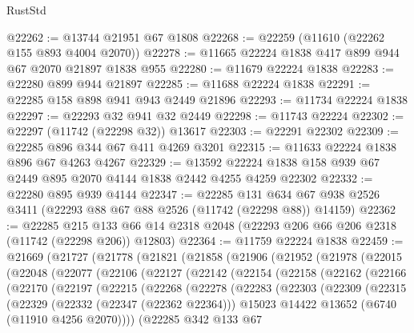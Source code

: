 \begin{lexlean}{RustStd}
\begin{coremodule}
@22262 := @13744 @21951 @67 @1808
@22268 := @22259 (@11610 (@22262 @155 @893 @4004 @2070))
@22278 := @11665 @22224 @1838 @417 @899 @944 @67 @2070 @21897 @1838 @955
@22280 := @11679 @22224 @1838
@22283 := @22280 @899 @944 @21897
@22285 := @11688 @22224 @1838
@22291 := @22285 @158 @898 @941 @943 @2449 @21896
@22293 := @11734 @22224 @1838
@22297 := @22293 @32 @941 @32 @2449
@22298 := @11743 @22224
@22302 := @22297 (@11742 (@22298 @32)) @13617
@22303 := @22291 @22302
@22309 := @22285 @896 @344 @67 @411 @4269 @3201
@22315 := @11633 @22224 @1838 @896 @67 @4263 @4267
@22329 := @13592 @22224 @1838 @158 @939 @67 @2449 @895 @2070 @4144 @1838 @2442 @4255 @4259 @22302
@22332 := @22280 @895 @939 @4144
@22347 := @22285
    @131
    @634
    @67
    @938
    @2526
    @3411
    (@22293 @88 @67 @88 @2526 (@11742 (@22298 @88)) @14159)
@22362 := @22285
    @215
    @133
    @66
    @14
    @2318
    @2048
    (@22293 @206 @66 @206 @2318 (@11742 (@22298 @206)) @12803)
@22364 := @11759 @22224 @1838
@22459 := @21669
    (@21727
      (@21778
        (@21821
          (@21858
            (@21906
              (@21952
                (@21978
                  (@22015
                    (@22048
                      (@22077
                        (@22106
                          (@22127
                            (@22142
                              (@22154
                                (@22158
                                  (@22162
                                    (@22166
                                      (@22170
                                        (@22197
                                          (@22215
                                            (@22268
                                              (@22278
                                                (@22283
                                                  (@22303
                                                    (@22309
                                                      (@22315
                                                        (@22329
                                                          (@22332 (@22347 (@22362 @22364)))
                                                          @15023
                                                          @14422
                                                          @13652
                                                          (@6740 (@11910 @4256 @2070))))
                                                      (@22285
                                                        @342
                                                        @133
                                                        @67

\end{coremodule}
\end{lexlean}

